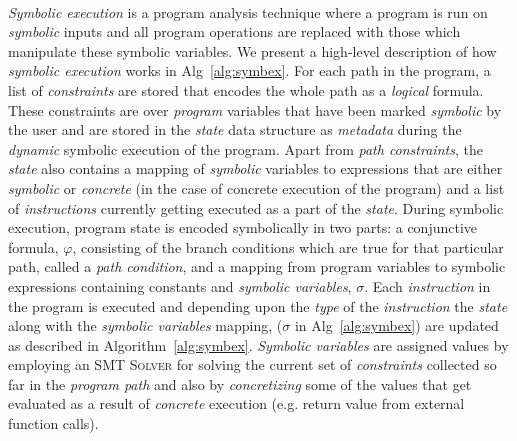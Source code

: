 \begin{algorithm}
\begin{algorithmic}[1]
		 
		\EndCase
		 
		\EndIf
		\EndCase
		\EndSwitch
		\EndWhile 
		 \\
		\EndFunction
	\end{algorithmic}
\end{algorithm}

\textit{Symbolic execution} is a program analysis technique where a program is run on \textit{symbolic} inputs and all program operations are replaced with those which manipulate these symbolic variables.
%
We present a high-level description of how \textit{symbolic execution} works in Alg~\ref{alg:symbex}. 
% 
For each path in the program, a list of \textit{constraints} are stored that encodes the whole path as a \textit{logical}
formula.
% 
These constraints are over \textit{program} variables that have been marked \textit{symbolic} by the user and are stored in the \textit{state} data structure as \textit{metadata} during the \textit{dynamic} symbolic execution of the program.
% 
Apart from \textit{path constraints}, the \textit{state} also contains a mapping of \textit{symbolic} variables to expressions that are either  \textit{symbolic} or \textit{concrete} (in the case of concrete execution of the program) and a list of \textit{instructions} currently getting executed as a part of the \textit{state}.	
% 
During symbolic execution, program state is encoded symbolically in two parts: a conjunctive formula, $\varphi$, consisting of the branch conditions which are true for that particular path, called a \textit{path condition}, and a mapping from program variables to symbolic expressions containing constants and \textit{symbolic variables}, $\sigma$.
% 
Each \textit{instruction} in the program is executed and depending upon the \textit{type} of the \textit{instruction} the \textit{state} along with the \textit{symbolic variables} mapping, ($\sigma$ in Alg~\ref{alg:symbex}) are updated as described in Algorithm~\ref{alg:symbex}.
% 
\textit{Symbolic variables} are assigned values by employing an \textsc{SMT Solver} for solving the current set of \textit{constraints} collected so far in the \textit{program path} and also by \textit{concretizing} some of the values that get evaluated as a result of \textit{concrete} execution (e.g. return value from external function calls).
